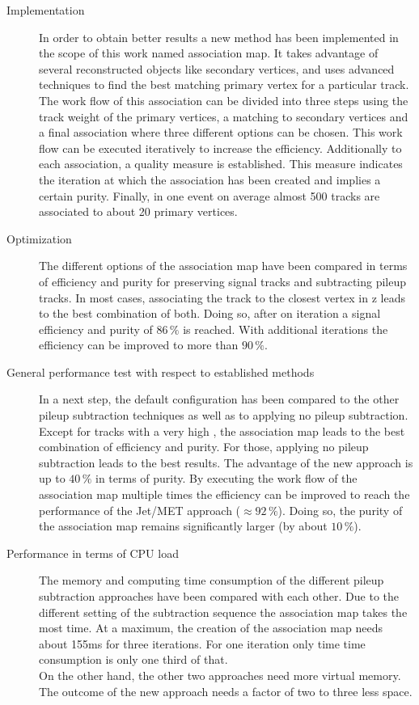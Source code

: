 \begin{description}

\item[Implementation] In order to obtain better results a new method has been implemented in the scope of this work named association map. It takes advantage of several reconstructed objects like secondary vertices, and uses advanced techniques to find the best matching primary vertex for a particular track. The work flow of this association can be divided into three steps using the track weight of the primary vertices, a matching to secondary vertices and a final association where three different options can be chosen. This work flow can be executed iteratively to increase the efficiency. Additionally to each association, a quality measure is established. This measure indicates the iteration at which the association has been created and implies a certain purity. Finally, in one event on average almost 500 tracks are associated to about 20 primary vertices.

\item[Optimization] The different options of the association map have been compared in terms of efficiency and purity for preserving signal tracks and subtracting pileup tracks. In most cases, associating the track to the closest vertex in z leads to the best combination of both. Doing so, after on iteration a signal efficiency and purity of $86\,\%$ is reached. With additional iterations the efficiency can be improved to more than $90\,\%$.

\item[General performance test with respect to established methods] In a next step, the default configuration has been compared to the other pileup subtraction techniques as well as to applying no pileup subtraction. Except for tracks with a very high \pt{}, the association map leads to the best combination of efficiency and purity. For those, applying no pileup subtraction leads to the best results. The advantage of the new approach is up to $40\,\%$ in terms of purity. By executing the work flow of the association map multiple times the efficiency can be improved to reach the performance of the Jet/MET approach ($\approx92\,\%$). Doing so, the purity of the association map remains significantly larger (by about $10\,\%$).

\item[Performance in terms of CPU load] The memory and computing time consumption of the different pileup subtraction approaches have been compared with each other. Due to the different setting of the subtraction sequence the association map takes the most time. At a maximum, the creation of the association map needs about 155\unit{ms} for three iterations. For one iteration only time time consumption is only one third of that. \\
On the other hand, the other two approaches need more virtual memory. The outcome of the new approach needs a factor of two to three less space.


\end{description}
